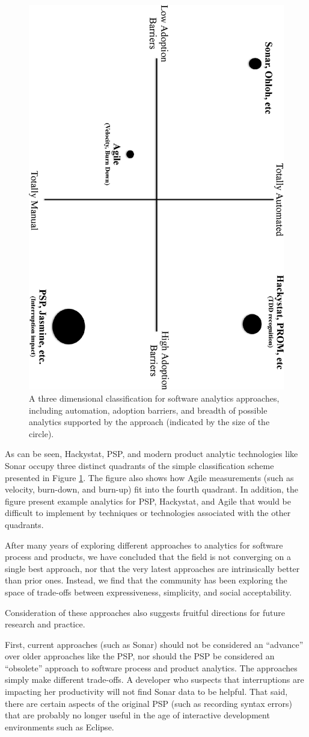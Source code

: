 \documentclass[]{article}
\begin{document}
\begin{figure}[!tb]
\centering
\includegraphics[width=0.50\columnwidth, angle=90]{axis.pptx.eps}
\caption{A three dimensional classification for software analytics approaches, including 
  automation, adoption barriers, and breadth of possible analytics supported by the
  approach (indicated by the size of the circle).}
\label{fig:axis}
\end{figure}

As can be seen, Hackystat, PSP, and modern product analytic technologies like Sonar occupy
three distinct quadrants of the simple classification scheme presented in Figure
\ref{fig:axis}. The figure also shows how Agile measurements (such as velocity, burn-down,
and burn-up) fit into the fourth quadrant.  In addition, the figure present example analytics
for PSP, Hackystat, and Agile that would be difficult to implement by techniques or
technologies associated with the other quadrants.

After many years of exploring different approaches to analytics for software process and
products, we have concluded that the field is not converging on a single best approach,
nor that the very latest approaches are intrinsically better than prior ones.  Instead, we
find that the community has been exploring the space of trade-offs between expressiveness,
simplicity, and social acceptability.  

Consideration of these approaches also suggests fruitful directions for future
research and practice.  

First, current approaches (such as Sonar) should not be considered an ``advance'' over
older approaches like the PSP, nor should the PSP be considered an ``obsolete'' approach
to software process and product analytics.  The approaches simply make different
trade-offs. A developer who suspects that interruptions are impacting her productivity
will not find Sonar data to be helpful.  That said, there are certain aspects of the
original PSP (such as recording syntax errors) that are probably no longer useful in the
age of interactive development environments such as Eclipse.
\end{document}
